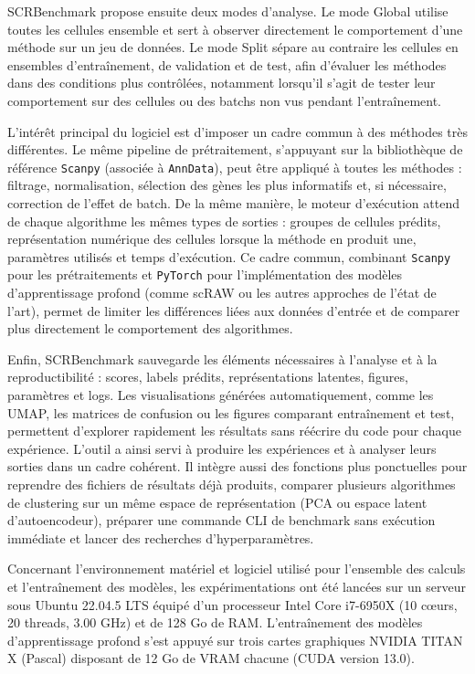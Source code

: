 SCRBenchmark propose ensuite deux modes d'analyse. Le mode Global utilise toutes les cellules ensemble et sert à observer directement le comportement d'une méthode sur un jeu de données. Le mode Split sépare au contraire les cellules en ensembles d'entraînement, de validation et de test, afin d'évaluer les méthodes dans des conditions plus contrôlées, notamment lorsqu'il s'agit de tester leur comportement sur des cellules ou des batchs non vus pendant l'entraînement.

L'intérêt principal du logiciel est d'imposer un cadre commun à des méthodes très différentes. Le même pipeline de prétraitement, s'appuyant sur la bibliothèque de référence \texttt{Scanpy} (associée à \texttt{AnnData}), peut être appliqué à toutes les méthodes : filtrage, normalisation, sélection des gènes les plus informatifs et, si nécessaire, correction de l'effet de batch. De la même manière, le moteur d'exécution attend de chaque algorithme les mêmes types de sorties : groupes de cellules prédits, représentation numérique des cellules lorsque la méthode en produit une, paramètres utilisés et temps d'exécution. Ce cadre commun, combinant \texttt{Scanpy} pour les prétraitements et \texttt{PyTorch} pour l'implémentation des modèles d'apprentissage profond (comme scRAW ou les autres approches de l'état de l'art), permet de limiter les différences liées aux données d'entrée et de comparer plus directement le comportement des algorithmes.

Enfin, SCRBenchmark sauvegarde les éléments nécessaires à l'analyse et à la reproductibilité : scores, labels prédits, représentations latentes, figures, paramètres et logs. Les visualisations générées automatiquement, comme les UMAP, les matrices de confusion ou les figures comparant entraînement et test, permettent d'explorer rapidement les résultats sans réécrire du code pour chaque expérience. L'outil a ainsi servi à produire les expériences et à analyser leurs sorties dans un cadre cohérent. Il intègre aussi des fonctions plus ponctuelles pour reprendre des fichiers de résultats déjà produits, comparer plusieurs algorithmes de clustering sur un même espace de représentation (PCA ou espace latent d'autoencodeur), préparer une commande CLI de benchmark sans exécution immédiate et lancer des recherches d'hyperparamètres.

Concernant l'environnement matériel et logiciel utilisé pour l'ensemble des calculs et l'entraînement des modèles, les expérimentations ont été lancées sur un serveur sous Ubuntu 22.04.5 LTS équipé d'un processeur Intel Core i7-6950X (10 cœurs, 20 threads, 3.00 GHz) et de 128 Go de RAM. L'entraînement des modèles d'apprentissage profond s'est appuyé sur trois cartes graphiques NVIDIA TITAN X (Pascal) disposant de 12 Go de VRAM chacune (CUDA version 13.0).

